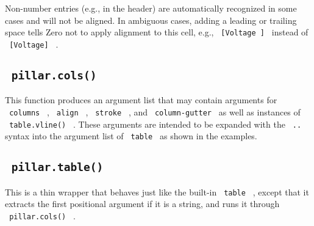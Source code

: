 \begin{Shaded}
\begin{Highlighting}[]

\NormalTok{  [Measurement], [14525.278],   [1.41],    [1.47],    [1.5e{-}5],}
\NormalTok{  [Uncertainty], [2],           [0.3],     [0.3],     [4e{-}6],}
\NormalTok{  [Ref. [2]],    [14525,74856], [1.37316], [1.43777], [5.401e{-}6]}
\NormalTok{)}
\end{Highlighting}
\end{Shaded}


Non-number entries (e.g., in the header) are automatically recognized in
some cases and will not be aligned. In ambiguous cases, adding a leading
or trailing space tells Zero not to apply alignment to this cell, e.g.,
\texttt{\ {[}Voltage\ {]}\ } instead of \texttt{\ {[}Voltage{]}\ } .

\subsection{\texorpdfstring{\texttt{\ pillar.cols()\ }}{ pillar.cols() }}\label{pillar.cols}

This function produces an argument list that may contain arguments for
\texttt{\ columns\ } , \texttt{\ align\ } , \texttt{\ stroke\ } , and
\texttt{\ column-gutter\ } as well as instances of
\texttt{\ table.vline()\ } . These arguments are intended to be expanded
with the \texttt{\ ..\ } syntax into the argument list of
\texttt{\ table\ } as shown in the examples.

\subsection{\texorpdfstring{\texttt{\ pillar.table()\ }}{ pillar.table() }}\label{pillar.table}

This is a thin wrapper that behaves just like the built-in
\texttt{\ table\ } , except that it extracts the first positional
argument if it is a string, and runs it through
\texttt{\ pillar.cols()\ } .

